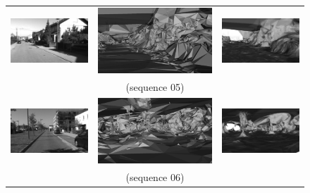 \begin{figure}[tp]
\centering
\setlength{\tabcolsep}{1px}
\begin{tabular}{ccc}
\includegraphics[height=0.2\textwidth]{./img/ch-incr-dens/05aorig00}&
\includegraphics[height=0.2\textwidth]{./img/ch-incr-dens/05ainit00}&
\includegraphics[height=0.2\textwidth]{./img/ch-incr-dens/05aref00}\\
&(sequence 05)&\\
\includegraphics[height=0.2\textwidth]{./img/ch-incr-dens/06aorig00}&
\includegraphics[height=0.2\textwidth]{./img/ch-incr-dens/06ainit00}&
\includegraphics[height=0.2\textwidth]{./img/ch-incr-dens/06aref00}\\
&(sequence 06)&\\

\end{tabular}
\end{figure}
